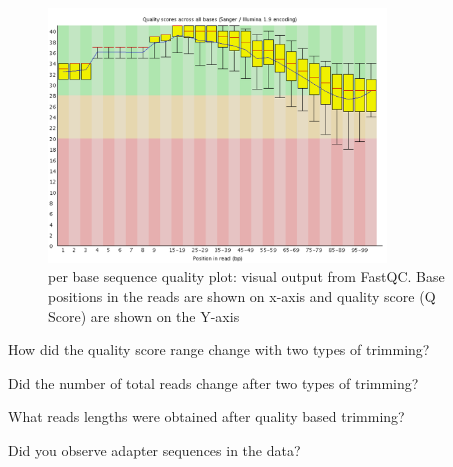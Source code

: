 \begin{steps}
\begin{figure}[htb]
\centering
\includegraphics[width=0.8\textwidth]{ngs-qc/bad_example_quality_trimmed.png}
\caption{per base sequence quality plot: visual output from FastQC. Base positions in the reads are shown on x-axis and quality score (Q Score) are shown on the Y-axis}
\label{fig:bad_example_quality_trimmed_plot}
\end{figure}

\end{steps}

\begin{questions}
How did the quality score range change with two types of trimming?

\vspace{3cm}

Did the number of total reads change after two types of trimming?

\vspace{3cm}

What reads lengths were obtained after quality based trimming?

\vspace{3cm}

Did you observe adapter sequences in the data?

\vspace{3cm}

\end{questions}

